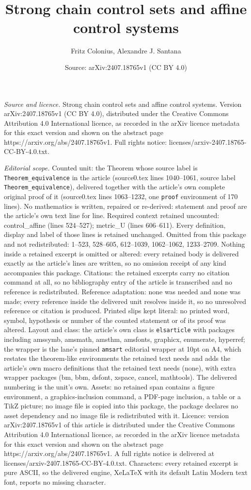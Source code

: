 \documentclass[10pt,a4paper]{amsart}
\title[Strong chain control sets and affine control systems]{Strong chain control sets and affine control systems}
\author{Fritz Colonius, Alexandre J. Santana}
\date{Source: arXiv:2407.18765v1 (CC BY 4.0)}
\begin{document}
\maketitle

\noindent\emph{Source and licence.} Strong chain control sets and affine control systems. Version arXiv:2407.18765v1 (CC BY 4.0), distributed under the Creative Commons Attribution 4.0 International licence, as recorded in the arXiv licence metadata for this exact version and shown on the abstract page https://arxiv.org/abs/2407.18765v1. Full rights notice: licenses/arxiv-2407.18765-CC-BY-4.0.txt.\par\smallskip

\noindent\textit{Editorial scope.} Counted unit: the Theorem whose source label is \texttt{Theorem\_equivalence} in the article (source0.tex lines 1040--1061, source label \texttt{Theorem\_equivalence}), delivered together with the article's own complete original proof of it (source0.tex lines 1063--1232, one \texttt{proof} environment of 170 lines). No mathematics is written, repaired or re-derived: statement and proof are the article's own text line for line. Required context retained uncounted: control\_affine (lines 524--527); metric\_U (lines 606--611). Every definition, display and label of those lines is retained unchanged. Omitted from this package and not redistributed: 1--523, 528--605, 612--1039, 1062--1062, 1233--2709. Nothing inside a retained excerpt is omitted or altered: every retained body is delivered exactly as the article's lines are written, so no omission receipt of any kind accompanies this package. Citations: the retained excerpts carry no citation command at all, so no bibliography entry of the article is transcribed and no reference is redistributed. Reference adaptation: none was needed and none was made; every reference inside the delivered unit resolves inside it, so no unresolved reference or citation is produced. Printed slips kept literal: no printed word, symbol, hypothesis or number of the counted statement or of its proof was altered. Layout and class: the article's own class is \texttt{elsarticle} with packages including amssymb, amsmath, amsthm, amsfonts, graphicx, enumerate, hyperref; the wrapper is the lane's pinned \texttt{amsart} editorial wrapper at 10pt on A4, which restates the theorem-like environments the retained text needs and adds the article's own macro definitions that the retained text needs (none), with extra wrapper packages (bm, bbm, dsfont, xspace, cancel, mathtools). The delivered numbering is the unit's own. Assets: no retained span contains a figure environment, a graphics-inclusion command, a PDF-page inclusion, a table or a TikZ picture; no image file is copied into this package, the package declares no asset dependency and no image file is redistributed with it. Licence: version arXiv:2407.18765v1 of this article is distributed under the Creative Commons Attribution 4.0 International licence, as recorded in the arXiv licence metadata for this exact version and shown on the abstract page https://arxiv.org/abs/2407.18765v1. A full rights notice is delivered at licenses/arxiv-2407.18765-CC-BY-4.0.txt. Characters: every retained excerpt is pure ASCII, so the delivered engine, XeLaTeX with its default Latin Modern text font, reports no missing character.
\end{document}
